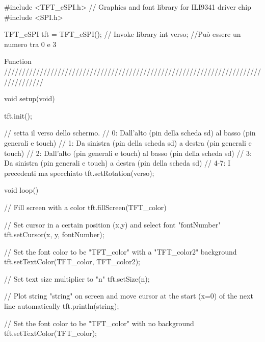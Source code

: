 #include <TFT_eSPI.h> // Graphics and font library for ILI9341 driver chip
#include <SPI.h>

TFT_eSPI tft = TFT_eSPI();  // Invoke library
int verso; //Può essere un numero tra 0 e 3

Function
///////////////////////////////////////////////////////////////////////////////////

void setup(void) {
    tft.init();

    // setta il verso dello schermo. 
    // 0: Dall'alto (pin della scheda sd) al basso (pin generali e touch)
    // 1: Da sinistra (pin della scheda sd) a destra (pin generali e touch)
    // 2: Dall'alto (pin generali e touch) al basso (pin della scheda sd)
    // 3: Da sinistra (pin generali e touch) a destra (pin della scheda sd)
    // 4-7: I precedenti ma specchiato
    tft.setRotation(verso); 
}

void loop(){
// Fill screen with a color
tft.fillScreen(TFT_color)

// Set cursor in a certain position (x,y) and select font "fontNumber"
tft.setCursor(x, y, fontNumber);

// Set the font color to be "TFT_color" with a "TFT_color2" background
tft.setTextColor(TFT_color, TFT_color2);

// Set text size multiplier to "n"
tft.setSize(n);

// Plot string "string" on screen and move cursor at the start (x=0) of the next line automatically
tft.println(string);

// Set the font color to be "TFT_color" with no background
tft.setTextColor(TFT_color);

}